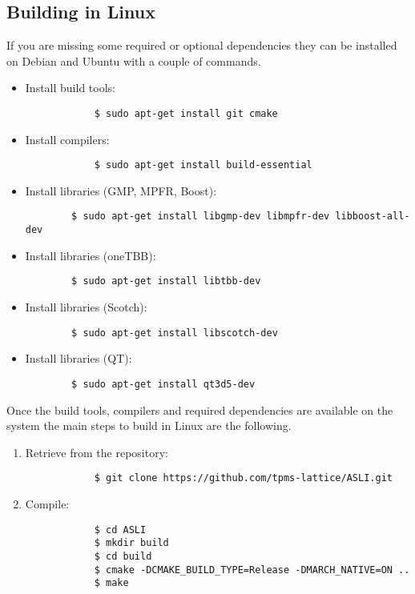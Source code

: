 \subsection{Building \asli{} in Linux}\label{sec:buildLin}

If you are missing some required or optional dependencies they can be installed on Debian and Ubuntu with a couple of commands.

\begin{itemize}
	\item Install build tools:
		\begin{verbatim}
			$ sudo apt-get install git cmake
		\end{verbatim}

	\item Install compilers:
		\begin{verbatim}
			$ sudo apt-get install build-essential
		\end{verbatim}

	\item Install libraries (GMP, MPFR, Boost):
	\begin{verbatim}
		$ sudo apt-get install libgmp-dev libmpfr-dev libboost-all-dev
	\end{verbatim}

	\item Install libraries (oneTBB):
	\begin{verbatim}
		$ sudo apt-get install libtbb-dev
	\end{verbatim}

	\item Install libraries (Scotch):
	\begin{verbatim}
		$ sudo apt-get install libscotch-dev
	\end{verbatim}

	\item Install libraries (QT):
	\begin{verbatim}
		$ sudo apt-get install qt3d5-dev
	\end{verbatim}
\end{itemize}

Once the build tools, compilers and required dependencies are available on the system the main steps to build \asli{} in Linux are the following.
\begin{enumerate}
	\item Retrieve \asli{} from the repository:
		\begin{verbatim}
			$ git clone https://github.com/tpms-lattice/ASLI.git
		\end{verbatim}
	\item Compile:
		\begin{verbatim}
			$ cd ASLI
			$ mkdir build
			$ cd build
			$ cmake -DCMAKE_BUILD_TYPE=Release -DMARCH_NATIVE=ON ..
			$ make
		\end{verbatim}
\end{enumerate}

